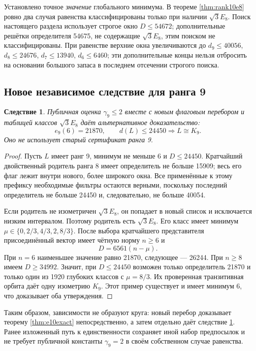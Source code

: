 \documentclass[11pt,a4paper]{article}
\newtheorem{corollary}[theorem]{Следствие}
\theoremstyle{remark}\newtheorem{remark}[theorem]{Замечание}
\begin{document}
Установлено точное \emph{значение} глобального минимума. В теореме \ref{thm:rank10e8} ровно два случая равенства классифицированы только при наличии $\sqrt3E_8$. Поиск настоящего раздела использует строгое окно $D\le54672$; дополнительные решётки определителя 54675, не содержащие $\sqrt3E_8$, этим поиском не классифицированы. При равенстве верхние окна увеличиваются до $d_9\le40056$, $d_8\le24676$, $d_7\le13940$, $d_6\le6460$; эти дополнительные концы нельзя отбросить на основании большого запаса в последнем отсечении строгого поиска.

\subsection{Новое независимое следствие для ранга 9}

\begin{corollary}\label{cor:newrank9}
Публичная оценка $\gamma_9\le2$ вместе с новым флаговым перебором и таблицей классов $\sqrt3E_8$ даёт альтернативное доказательство:
\[
e_9(6)=21870,\qquad d(L)\le24450\Longrightarrow L\cong K_9.
\]
Оно не использует старый сертификат ранга 9.
\end{corollary}

\begin{proof}
Пусть $L$ имеет ранг 9, минимум не меньше 6 и $D\le24450$. Кратчайший двойственный родитель ранга 8 имеет определитель не больше 15909; весь его флаг лежит внутри нового, более широкого окна. Все применённые к этому префиксу необходимые фильтры остаются верными, поскольку последний определитель не больше 24450 и, следовательно, не больше 40054.

Если родитель не изометричен $\sqrt3E_8$, он попадает в новый список и исключается низким интервалом. Поэтому родитель есть $\sqrt3E_8$. Его класс имеет минимум $\mu\in\{0,2/3,4/3,2,8/3\}$. После выбора кратчайшего представителя присоединённый вектор имеет чётную норму $n\ge6$ и
\[
D=6561(n-\mu).
\]
При $n=6$ наименьшее значение равно 21870, следующее --- 26244. При $n\ge8$ имеем $D\ge34992$. Значит, при $D\le24450$ возможен только определитель 21870 и только один из 1920 глубоких классов с $\mu=8/3$. Их проверенная транзитивная орбита даёт одну изометрию $K_9$. Этот пример существует и имеет минимум 6, что доказывает оба утверждения.
\end{proof}

Таким образом, зависимости не образуют круга: новый перебор доказывает теорему \ref{thm:e10exact} непосредственно, а затем отдельно даёт следствие \ref{cor:newrank9}. Ранее изложенный путь к единственности сохраняет иной набор предпосылок и не требует публичной константы $\gamma_9=2$ в своём собственном случае равенства.
\end{document}
